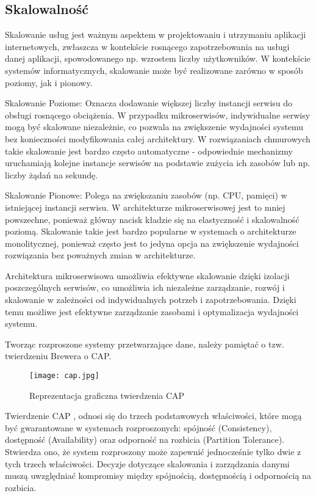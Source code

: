 \subsection{Skalowalność}

Skalowanie usług jest ważnym aspektem w projektowaniu i utrzymaniu aplikacji internetowych, zwłaszcza w kontekście rosnącego zapotrzebowania na usługi danej aplikacji, spowodowanego np. wzrostem liczby użytkowników. W kontekście systemów informatycznych, skalowanie może być realizowane zarówno w sposób poziomy, jak i pionowy.

Skalowanie Poziome: Oznacza dodawanie większej liczby instancji serwisu do obsługi rosnącego obciążenia. W przypadku mikroserwisów, indywidualne serwisy mogą być skalowane niezależnie, co pozwala na zwiększenie wydajności systemu bez konieczności modyfikowania całej architektury. W rozwiązaniach chmurowych takie skalowanie jest bardzo często automatyczne - odpowiednie mechanizmy uruchamiają kolejne instancje serwisów na podstawie zużycia ich zasobów lub np. liczby żądań na sekundę.

Skalowanie Pionowe: Polega na zwiększaniu zasobów (np. CPU, pamięci) w istniejącej instancji serwisu. W architekturze mikroserwisowej jest to mniej powszechne, ponieważ główny nacisk kładzie się na elastyczność i skalowalność poziomą. Skalowanie takie jest bardzo popularne w systemach o architekturze monolitycznej, ponieważ często jest to jedyna opcja na zwiększenie wydajności rozwiązania bez poważnych zmian w architekturze.

Architektura mikroserwisowa umożliwia efektywne skalowanie dzięki izolacji poszczególnych serwisów, co umożliwia ich niezależne zarządzanie, rozwój i skalowanie w zależności od indywidualnych potrzeb i zapotrzebowania. Dzięki temu możliwe jest efektywne zarządzanie zasobami i optymalizacja wydajności systemu.

Tworząc rozproszone systemy przetwarzające dane, należy pamiętać o tzw. twierdzeniu Brewera o CAP.

\begin{figure}[!h]
    \centering \texttt{[image: cap.jpg]}
    \caption{Reprezentacja graficzna twierdzenia CAP \cite{cap_rys}}
\end{figure}

Twierdzenie CAP \cite{cap}, odnosi się do trzech podstawowych właściwości, które mogą być gwarantowane w systemach rozproszonych: spójność (Consistency), dostępność (Availability) oraz odporność na rozbicia (Partition Tolerance). Stwierdza ono, że system rozproszony może zapewnić jednocześnie tylko dwie z tych trzech właściwości. Decyzje dotyczące skalowania i zarządzania danymi muszą uwzględniać kompromisy między spójnością, dostępnością i odpornością na rozbicia.

